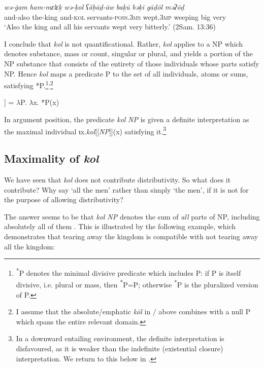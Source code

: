 \documentclass[output=paper]{langsci/langscibook}
\begin{document}
\ea%
    \label{ex:doron:21}
    \gll \textit{wə-ḡam}   \textit{ham-mɛlɛḵ}  \textit{wə-ḵol}     \textit{ʕăḇāḏ-āw}                  \textit{baḵū}          \textit{bəḵī}         \textit{gāḏōl} \textit{məʔōḏ}\\
         and-also  the-king      and-\textsc{kol} servants-\textsc{poss.3ms}  wept.\textsc{3mp}   weeping  big      very\\
    \glt `Also the king and all his servants wept very bitterly.' (2Sam. 13:36)
\z



I conclude that \textit{kol} is not quantificational. Rather, \textit{kol} applies to a NP which denotes substance, mass or count, singular or plural, and yields a portion of the NP substance that consists of the entirety of those individuals whose parts satisfy NP. Hence \textit{kol} maps a predicate P to the set of all individuals, atoms or sums, satisfying *P.\footnote{\textrm{\textsuperscript{*}}\textrm{P denotes the minimal divisive predicate \citep{Krifka1989} which includes P: if P is itself divisive, i.e. plural or mass, then} \textrm{\textsuperscript{*}}\textrm{P=P; otherwise} \textrm{\textsuperscript{*}}\textrm{P is the pluralized version of P.}}\textsuperscript{,}\footnote{\textrm{I assume that the absolute/emphatic} \textrm{\textit{kōl} }\textrm{in / above combines with a null P which spans the entire relevant domain.}}

\ea%
    \label{ex:doron:22}\relax
    [[kol]] =  ${\lambda}$P. ${\lambda}$x. *P(x)
    \z

In argument position, the predicate \textit{kol} \textit{NP} is given a definite interpretation as the maximal individual ιx.\textit{kol}[[\textit{NP}]](x) satisfying it.\footnote{\textrm{In a downward entailing environment, the definite interpretation is disfavoured, as it is weaker than the indefinite (existential closure) interpretation. We return to this below in .}}

\subsection{Maximality of \textit{kol}}\label{sec:doron:3.2}%

We have seen that \textit{kol} does not contribute distributivity. So what does it contribute? Why say ‘all the men’ rather than simply ‘the men’, if it is not for the purpose of allowing distributivity?

The answer seems to be that \textit{kol} \textit{NP} denotes the sum of \textit{all} parts of NP, including absolutely all of them \citet{Brisson1997,Brisson2003}. This is illustrated by the following example, which demonstrates that tearing away the kingdom is compatible with not tearing away all the kingdom:
\end{document}
